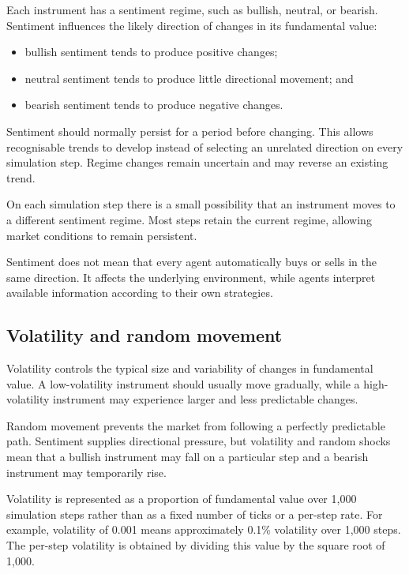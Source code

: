 \documentclass{article}
\begin{document}
Each instrument has a sentiment regime, such as bullish, neutral,
or bearish. Sentiment influences the likely direction of changes in its
fundamental value:

\begin{itemize}
    \item bullish sentiment tends to produce positive changes;
    \item neutral sentiment tends to produce little directional movement; and
    \item bearish sentiment tends to produce negative changes.
\end{itemize}

Sentiment should normally persist for a period before changing. This allows
recognisable trends to develop instead of selecting an unrelated direction on
every simulation step. Regime changes remain uncertain and may reverse an
existing trend.

On each simulation step there is a small possibility that an instrument moves
to a different sentiment regime. Most steps retain the current regime, allowing
market conditions to remain persistent.

Sentiment does not mean that every agent automatically buys or sells in the
same direction. It affects the underlying environment, while agents interpret
available information according to their own strategies.

\subsection{Volatility and random movement}

Volatility controls the typical size and variability of changes in fundamental
value. A low-volatility instrument should usually move gradually, while a
high-volatility instrument may experience larger and less predictable changes.

Random movement prevents the market from following a perfectly predictable
path. Sentiment supplies directional pressure, but volatility and random shocks
mean that a bullish instrument may fall on a particular step and a bearish
instrument may temporarily rise.

Volatility is represented as a proportion of fundamental value over 1,000
simulation steps rather than as a fixed number of ticks or a per-step rate. For
example, volatility of 0.001 means approximately 0.1\% volatility over 1,000
steps. The per-step volatility is obtained by dividing this value by the square
root of 1,000.
\end{document}
